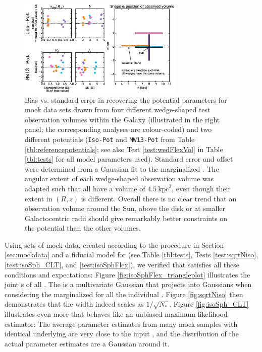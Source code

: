 

\begin{figure}[!htbp]
\centering
\includegraphics[width=0.7\textwidth]{figs/wedFlexVol_bias_vs_SE.eps}
\caption{Bias vs. standard error in recovering the potential parameters for mock data sets drawn from four different wedge-shaped test observation volumes within the Galaxy (illustrated in the right panel; the corresponding analyses are colour-coded) and two different potentials (\texttt{Iso-Pot} and \texttt{MW13-Pot} from Table \ref{tbl:referencepotentials}; see also Test \ref{test:wedFlexVol} in Table \ref{tbl:tests} for all model parameters used). Standard error and offset were determined from a Gaussian fit to the marginalized \pdf{}. The angular extent of each wedge-shaped observation volume was adapted such that all have a volume of $4.5~\text{kpc}^3$, even though their extent in $(R,z)$ is different. Overall there is no clear trend that an observation volume around the Sun, above the disk or at smaller Galactocentric radii should give remarkably better constraints on the potential than the other volumes.}
\label{fig:wedFlexVol_bias_vs_SE}
\end{figure}



Using sets of mock data, created according to the procedure in Section \ref{sec:mockdata} and a fiducial model for \pmodel{} (see Table \ref{tbl:tests}, Tests \ref{test:sqrtNiso}, \ref{test:isoSph_CLT}, and \ref{test:isoSphFlex}), we verified that \RM{} satisfies all these conditions and expectations: Figure \ref{fig:isoSphFlex_triangleplot} illustrates the joint \pdf{}s of all \pmodel{}. The \pdf{} is a multivariate Gaussian that projects into Gaussians when considering the marginalized \pdf{} for all the individual \pmodel{}. Figure \ref{fig:sqrtNiso} then demonstrates that the \pdf{} width indeed scales as $1/\sqrt{N_{*}}$. Figure \ref{fig:isoSph_CLT} illustrates even more that \RM{} behaves like an unbiased maximum likelihood estimator: The average parameter estimates from many mock samples with identical underlying \pmodel{} are very close to the input \pmodel{}, and the distribution of the actual parameter estimates are a Gaussian around it. 
